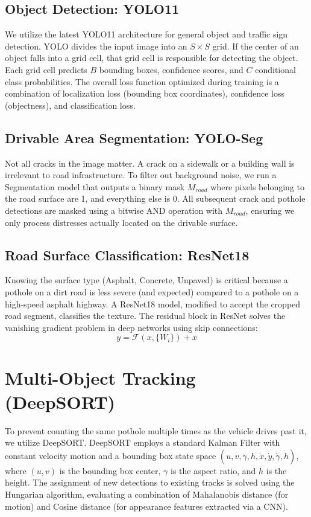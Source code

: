 \subsection{Object Detection: YOLO11}
We utilize the latest YOLO11 architecture for general object and traffic sign detection. YOLO divides the input image into an $S \times S$ grid. If the center of an object falls into a grid cell, that grid cell is responsible for detecting the object. Each grid cell predicts $B$ bounding boxes, confidence scores, and $C$ conditional class probabilities.
The overall loss function optimized during training is a combination of localization loss (bounding box coordinates), confidence loss (objectness), and classification loss.

\subsection{Drivable Area Segmentation: YOLO-Seg}
Not all cracks in the image matter. A crack on a sidewalk or a building wall is irrelevant to road infrastructure. To filter out background noise, we run a Segmentation model that outputs a binary mask $M_{road}$ where pixels belonging to the road surface are 1, and everything else is 0. All subsequent crack and pothole detections are masked using a bitwise AND operation with $M_{road}$, ensuring we only process distresses actually located on the drivable surface.

\subsection{Road Surface Classification: ResNet18}
Knowing the surface type (Asphalt, Concrete, Unpaved) is critical because a pothole on a dirt road is less severe (and expected) compared to a pothole on a high-speed asphalt highway. A ResNet18 model, modified to accept the cropped road segment, classifies the texture. The residual block in ResNet solves the vanishing gradient problem in deep networks using skip connections:
\begin{equation}
    y = \mathcal{F}(x, \{W_i\}) + x
\end{equation}

\section{Multi-Object Tracking (DeepSORT)}
To prevent counting the same pothole multiple times as the vehicle drives past it, we utilize DeepSORT. DeepSORT employs a standard Kalman Filter with constant velocity motion and a bounding box state space $(u, v, \gamma, h, \dot{x}, \dot{y}, \dot{\gamma}, \dot{h})$, where $(u, v)$ is the bounding box center, $\gamma$ is the aspect ratio, and $h$ is the height.
The assignment of new detections to existing tracks is solved using the Hungarian algorithm, evaluating a combination of Mahalanobis distance (for motion) and Cosine distance (for appearance features extracted via a CNN).

